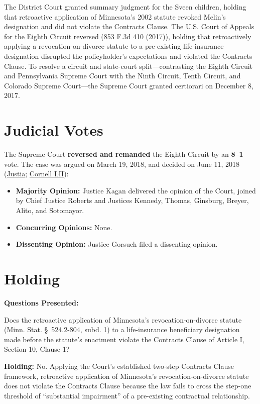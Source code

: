 \documentclass[12pt]{article}
\begin{document}
The District Court granted summary judgment for the Sveen children, holding that retroactive application of Minnesota's 2002 statute revoked Melin's designation and did not violate the Contracts Clause. The U.S. Court of Appeals for the Eighth Circuit reversed (853 F.3d 410 (2017)), holding that retroactively applying a revocation-on-divorce statute to a pre-existing life-insurance designation disrupted the policyholder's expectations and violated the Contracts Clause. To resolve a circuit and state-court split---contrasting the Eighth Circuit and Pennsylvania Supreme Court with the Ninth Circuit, Tenth Circuit, and Colorado Supreme Court---the Supreme Court granted certiorari on December 8, 2017.

\section{Judicial Votes}
The Supreme Court \textbf{reversed and remanded} the Eighth Circuit by an \textbf{8--1} vote. The case was argued on March 19, 2018, and decided on June 11, 2018 (\href{https://supreme.justia.com/cases/federal/us/584/16-1432/}{Justia}; \href{https://www.law.cornell.edu/supremecourt/text/16-1432}{Cornell LII}):

\begin{itemize}
    \item \textbf{Majority Opinion:} Justice Kagan delivered the opinion of the Court, joined by Chief Justice Roberts and Justices Kennedy, Thomas, Ginsburg, Breyer, Alito, and Sotomayor.
    \item \textbf{Concurring Opinions:} None.
    \item \textbf{Dissenting Opinion:} Justice Gorsuch filed a dissenting opinion.
\end{itemize}

\section{Holding}
\textbf{Questions Presented:}

Does the retroactive application of Minnesota's revocation-on-divorce statute (Minn. Stat. \S~524.2-804, subd. 1) to a life-insurance beneficiary designation made before the statute's enactment violate the Contracts Clause of Article I, Section 10, Clause 1?

\textbf{Holding:} No. Applying the Court's established two-step Contracts Clause framework, retroactive application of Minnesota's revocation-on-divorce statute does not violate the Contracts Clause because the law fails to cross the step-one threshold of ``substantial impairment'' of a pre-existing contractual relationship.
\end{document}
